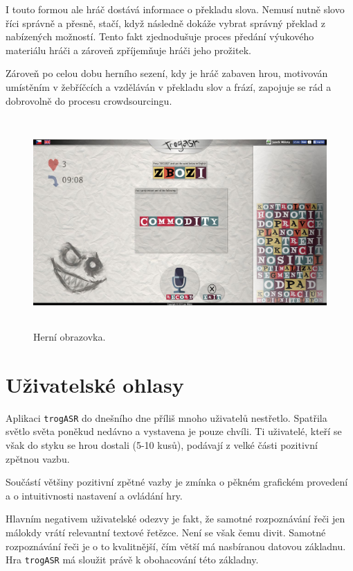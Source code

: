 I touto formou ale hráč dostává informace o překladu slova. Nemusí nutně slovo říci správně a přesně, stačí, když následně dokáže vybrat správný překlad z nabízených možností. Tento fakt zjednodušuje proces předání výukového materiálu hráči a zároveň zpříjemňuje hráči jeho prožitek.

Zároveň po celou dobu herního sezení, kdy je hráč zabaven hrou, motivován umístěním v žebříčcích a vzděláván v překladu slov a frází, zapojuje se rád a dobrovolně do procesu crowdsourcingu.

\begin{figure}[h]
	\centering
	\includegraphics[width=140mm,height=80mm]{img/game.jpg}
	\caption{Herní obrazovka.}
	\label{fig:game}
\end{figure}

\section{Uživatelské ohlasy}

Aplikaci \verb|trogASR| do dnešního dne příliš mnoho uživatelů nestřetlo. Spatřila světlo světa poněkud nedávno a vystavena je pouze chvíli. Ti uživatelé, kteří se však do styku se hrou dostali (5-10 kusů), podávají z velké části pozitivní zpětnou vazbu.

Součástí většiny pozitivní zpětné vazby je zmínka o pěkném grafickém provedení a o intuitivnosti nastavení a ovládání hry.

Hlavním negativem uživatelské odezvy je fakt, že samotné rozpoznávání řeči jen málokdy vrátí relevantní textové řetězce. Není se však čemu divit. Samotné rozpoznávání řeči je o to kvalitnější, čím větší má nasbíranou datovou základnu. Hra \verb|trogASR| má sloužit právě k obohacování této základny.